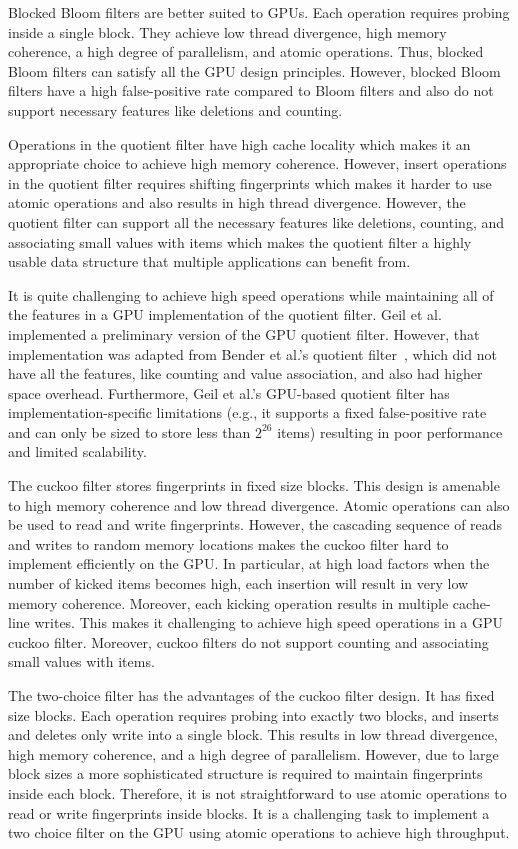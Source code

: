 Blocked Bloom filters are better suited to GPUs.  Each operation requires
probing inside a single block. They achieve low thread divergence, high memory
coherence, a high degree of parallelism, and atomic operations. Thus, blocked
Bloom filters can satisfy all the GPU design principles. However, blocked Bloom
filters have a high false-positive rate compared to Bloom filters and also do
not support necessary features like deletions and counting.

Operations in the quotient filter have high cache locality which makes it an
appropriate choice to achieve high memory coherence. However, insert operations
in the quotient filter requires shifting fingerprints which makes it harder to
use atomic operations and also results in high thread divergence. However, the
quotient filter can support all the necessary features like deletions, counting,
and associating small values with items which makes the quotient filter a highly
usable data structure that multiple applications can benefit from.

It is quite challenging to achieve high speed operations while maintaining all
of the features in a GPU implementation of the quotient filter. Geil et
al.~\cite{Geil:2018:QFA} implemented a preliminary version of the GPU quotient filter.
However, that implementation was adapted from Bender et al.'s quotient
filter~\cite{BenderFaJo12a}, which did not have all the features, like counting
and value association, and also had higher space overhead. Furthermore, Geil et
al.'s GPU-based quotient filter has implementation-specific limitations (e.g., it
supports a fixed false-positive rate and can only be sized to store less than
$2^{26}$ items) resulting in poor performance and limited scalability.

The cuckoo filter stores fingerprints in fixed size blocks. This design is
amenable to high memory coherence and low thread divergence. Atomic operations
can also be used to read and write fingerprints. However, the cascading sequence
of reads and writes to random memory locations makes the cuckoo filter hard to
implement efficiently on the GPU\@. In particular, at high load factors when the
number of kicked items becomes high, each insertion will result in very low
memory coherence. Moreover, each kicking operation results in multiple
cache-line writes. This makes it challenging to achieve high speed operations in
a GPU cuckoo filter. Moreover, cuckoo filters do not support counting and
associating small values with items.

The two-choice filter has the advantages of the cuckoo filter design. It has
fixed size blocks. Each operation requires probing into exactly two blocks, and
inserts and deletes only write into a single block. This results in low thread
divergence, high memory coherence, and a high degree of parallelism. However,
due to large block sizes a more sophisticated structure is required to maintain
fingerprints inside each block. Therefore, it is not straightforward to use
atomic operations to read or write fingerprints inside blocks. It is a
challenging task to implement a two choice filter on the GPU using atomic
operations to achieve high throughput.

\fi
